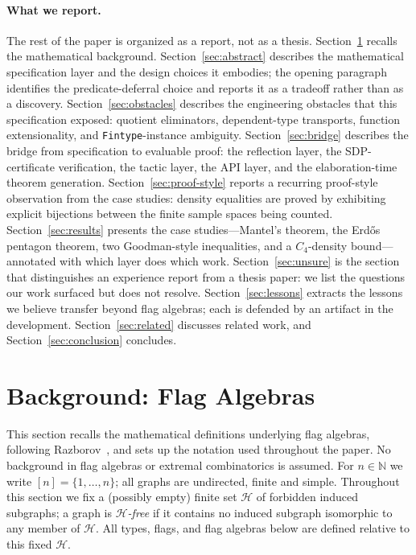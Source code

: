 \documentclass{article}
\newcommand{\lean}[1]{\texttt{#1}}
\begin{document}
\paragraph{What we report.}
The rest of the paper is organized as a report, not as a thesis.
Section~\ref{sec:background} recalls the mathematical background.
Section~\ref{sec:abstract} describes the mathematical specification layer
and the design choices it embodies; the opening paragraph identifies the
predicate-deferral choice and reports it as a tradeoff rather than as a
discovery.
Section~\ref{sec:obstacles} describes the engineering obstacles that this
specification exposed: quotient eliminators, dependent-type transports,
function extensionality, and \lean{Fintype}-instance ambiguity.
Section~\ref{sec:bridge} describes the bridge from specification to evaluable
proof: the reflection layer, the SDP-certificate verification, the tactic
layer, the API layer, and the elaboration-time theorem generation.
Section~\ref{sec:proof-style} reports a recurring proof-style observation
from the case studies: density equalities are proved by exhibiting explicit
bijections between the finite sample spaces being counted.
Section~\ref{sec:results} presents the case studies---Mantel's theorem, the
Erd\H{o}s pentagon theorem, two Goodman-style inequalities, and a
$C_4$-density bound---annotated with which layer does which work.
Section~\ref{sec:unsure} is the section that distinguishes an experience
report from a thesis paper: we list the questions our work surfaced but does
not resolve.  Section~\ref{sec:lessons} extracts the lessons we believe
transfer beyond flag algebras; each is defended by an artifact in the
development.  Section~\ref{sec:related} discusses related work, and
Section~\ref{sec:conclusion} concludes.


\section{Background: Flag Algebras}
\label{sec:background}

This section recalls the mathematical definitions underlying flag algebras,
following Razborov~\cite{razborov2007flag}, and sets up the notation used
throughout the paper.  No background in flag algebras or extremal
combinatorics is assumed.  For $n \in \mathbb{N}$ we write
$[n] = \{1,\ldots,n\}$; all graphs are undirected, finite and simple.
Throughout this section we fix a (possibly empty) finite set $\mathcal{H}$ of
forbidden induced subgraphs; a graph is \emph{$\mathcal{H}$-free} if it
contains no induced subgraph isomorphic to any member of $\mathcal{H}$.
All types, flags, and flag algebras below are defined relative to this
fixed $\mathcal{H}$.
\end{document}
